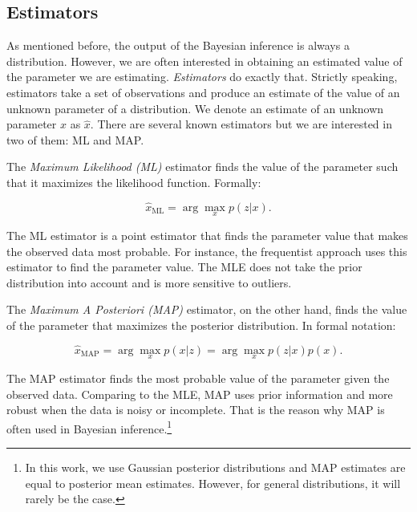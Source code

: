 \subsection{Estimators}\label{sec:estimators}

As mentioned before, the output of the Bayesian inference is always a
distribution. However, we are often interested in obtaining an estimated value
of the parameter we are estimating. \textit{Estimators} do exactly that.
Strictly speaking, estimators take a set of observations and produce an 
estimate of the value of an unknown parameter of a distribution. We denote an
estimate of an unknown parameter $x$ as $\hat{x}$. There are several known 
estimators but we are interested in two of them: ML and MAP.

The \textit{Maximum Likelihood (ML)} estimator finds the value of the parameter 
such that it maximizes the likelihood function. Formally:

$$
\hat{x}_{\mathrm{ML}} = \arg \max_x p(z|x).
$$

The ML estimator is a point estimator that finds the parameter value that 
makes the observed data most probable. For instance, the frequentist approach
uses this estimator to find the parameter value. The MLE does not take the 
prior distribution into account and is more sensitive to outliers. 

The \textit{Maximum A Posteriori (MAP)} estimator, on the other hand, finds the 
value of the parameter that maximizes the posterior distribution. In formal 
notation:

$$
\hat{x}_{\mathrm{MAP}} = \arg \max_x p(x|z) = \arg \max_x p(z|x)p(x).
$$

The MAP estimator finds the most probable value of the parameter given the 
observed data. Comparing to the MLE, MAP uses prior information and more robust
when the data is noisy or incomplete. That is the reason why MAP is often used
in Bayesian inference.\footnote{
    In this work, we use Gaussian posterior distributions and MAP estimates are 
    equal to posterior mean estimates. However, for general distributions, it
    will rarely be the case.
}
